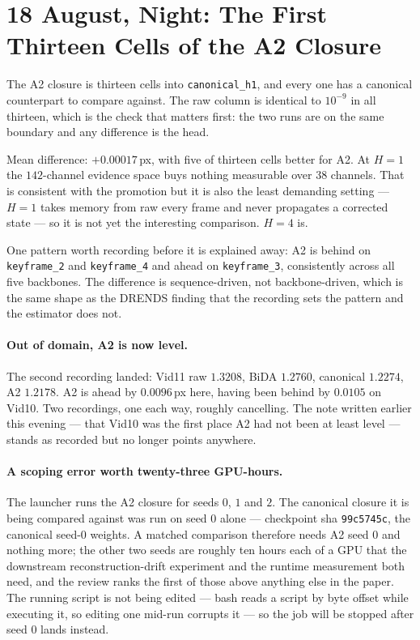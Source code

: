 \documentclass[11pt,a4paper]{article}
\begin{document}
\section*{18 August, Night: The First Thirteen Cells of the A2 Closure}

The A2 closure is thirteen cells into \texttt{canonical\_h1}, and every one has a
canonical counterpart to compare against. The raw column is identical to $10^{-9}$
in all thirteen, which is the check that matters first: the two runs are on the
same boundary and any difference is the head.

Mean difference: $+0.00017$\,px, with five of thirteen cells better for A2. At
$H{=}1$ the $142$-channel evidence space buys nothing measurable over $38$
channels. That is consistent with the promotion but it is also the least
demanding setting --- $H{=}1$ takes memory from raw every frame and never
propagates a corrected state --- so it is not yet the interesting comparison.
$H{=}4$ is.

One pattern worth recording before it is explained away: A2 is behind on
\texttt{keyframe\_2} and \texttt{keyframe\_4} and ahead on \texttt{keyframe\_3},
consistently across all five backbones. The difference is sequence-driven, not
backbone-driven, which is the same shape as the DRENDS finding that the recording
sets the pattern and the estimator does not.

\paragraph{Out of domain, A2 is now level.} The second recording landed:
Vid11 raw $1.3208$, BiDA $1.2760$, canonical $1.2274$, A2 $1.2178$. A2 is ahead
by $0.0096$\,px here, having been behind by $0.0105$ on Vid10. Two recordings,
one each way, roughly cancelling. The note written earlier this evening --- that
Vid10 was the first place A2 had not been at least level --- stands as recorded
but no longer points anywhere.

\paragraph{A scoping error worth twenty-three GPU-hours.} The launcher runs the
A2 closure for seeds $0$, $1$ and $2$. The canonical closure it is being compared
against was run on seed $0$ alone --- checkpoint sha \texttt{99c5745c}, the
canonical seed-0 weights. A matched comparison therefore needs A2 seed $0$ and
nothing more; the other two seeds are roughly ten hours each of a GPU that the
downstream reconstruction-drift experiment and the runtime measurement both need,
and the review ranks the first of those above anything else in the paper. The
running script is not being edited --- bash reads a script by byte offset while
executing it, so editing one mid-run corrupts it --- so the job will be stopped
after seed $0$ lands instead.
\end{document}
